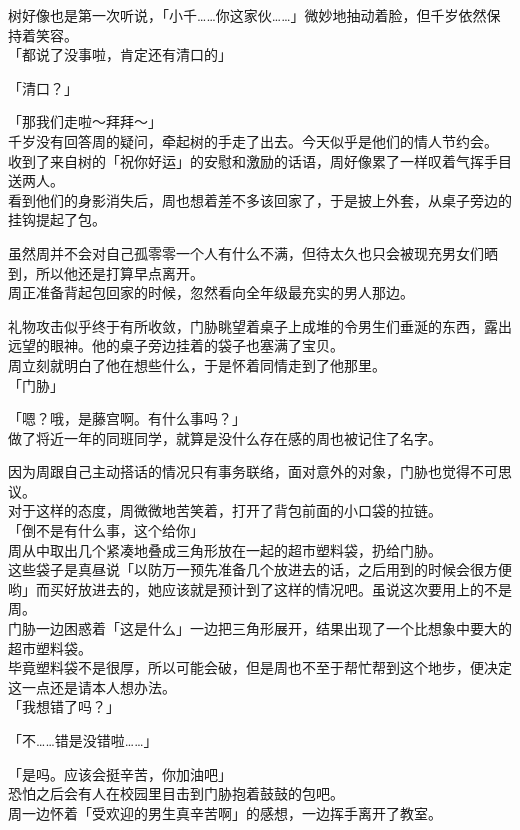 树好像也是第一次听说，「小千……你这家伙……」微妙地抽动着脸，但千岁依然保持着笑容。\\

「都说了没事啦，肯定还有清口的」

「清口？」

「那我们走啦～拜拜～」\\

千岁没有回答周的疑问，牵起树的手走了出去。今天似乎是他们的情人节约会。\\

收到了来自树的「祝你好运」的安慰和激励的话语，周好像累了一样叹着气挥手目送两人。\\

看到他们的身影消失后，周也想着差不多该回家了，于是披上外套，从桌子旁边的挂钩提起了包。

虽然周并不会对自己孤零零一个人有什么不满，但待太久也只会被现充男女们晒到，所以他还是打算早点离开。\\

周正准备背起包回家的时候，忽然看向全年级最充实的男人那边。

礼物攻击似乎终于有所收敛，门胁眺望着桌子上成堆的令男生们垂涎的东西，露出远望的眼神。他的桌子旁边挂着的袋子也塞满了宝贝。\\

周立刻就明白了他在想些什么，于是怀着同情走到了他那里。\\

「门胁」

「嗯？哦，是藤宫啊。有什么事吗？」\\

做了将近一年的同班同学，就算是没什么存在感的周也被记住了名字。

因为周跟自己主动搭话的情况只有事务联络，面对意外的对象，门胁也觉得不可思议。\\

对于这样的态度，周微微地苦笑着，打开了背包前面的小口袋的拉链。\\

「倒不是有什么事，这个给你」\\

周从中取出几个紧凑地叠成三角形放在一起的超市塑料袋，扔给门胁。\\

这些袋子是真昼说「以防万一预先准备几个放进去的话，之后用到的时候会很方便哟」而买好放进去的，她应该就是预计到了这样的情况吧。虽说这次要用上的不是周。\\

门胁一边困惑着「这是什么」一边把三角形展开，结果出现了一个比想象中要大的超市塑料袋。\\

毕竟塑料袋不是很厚，所以可能会破，但是周也不至于帮忙帮到这个地步，便决定这一点还是请本人想办法。\\

「我想错了吗？」

「不……错是没错啦……」

「是吗。应该会挺辛苦，你加油吧」\\

恐怕之后会有人在校园里目击到门胁抱着鼓鼓的包吧。\\

周一边怀着「受欢迎的男生真辛苦啊」的感想，一边挥手离开了教室。
